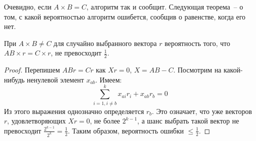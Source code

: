 Очевидно, если $A\times B=C$, алгоритм так и сообщит. Следующая теорема~-- о том, с какой вероятностью алгоритм ошибется, сообщив о равенстве, когда его нет.

\begin{theorem*}
    При $A\times B \neq C$ для случайно выбранного вектора $r$ вероятность того, что $AB\times r = C\times r$, не превосходит $\frac{1}{2}$.
\end{theorem*}
\begin{proof}
Перепишем $ABr = Cr$ как $Xr=0$, $X=AB-C$. Посмотрим на какой-нибудь ненулевой элемент $x_{ab}$. Имеем:
$$\sum_{i=1, i\ne b}^{k} x_{ai}r_i+x_{ab}r_b=0$$
Из этого выражения однозначно определяется $r_b$. Это означает, что уже векторов $r$, удовлетворяющих $Xr=0$, не более $2^{k-1}$, а шанс выбрать такой вектор не превосходит $\frac{2^{k-1}}{2^k} = \frac{1}{2}$. Таким образом, вероятность ошибки $\le\frac{1}{2}$. \end{proof}
